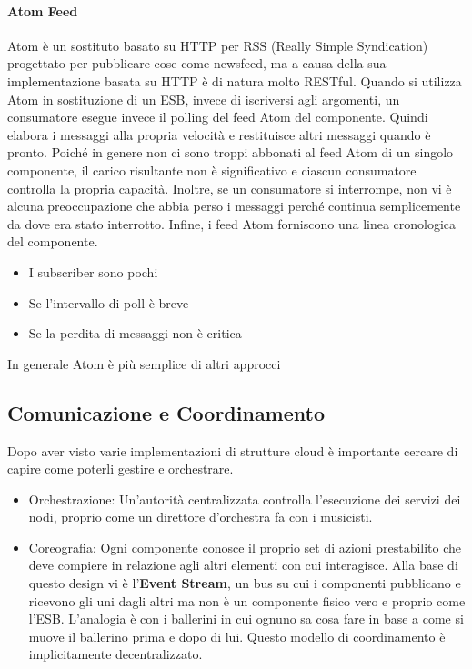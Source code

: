 \documentclass{article}
\begin{document}
		\paragraph{Atom Feed}
		Atom è un sostituto basato su HTTP per RSS (Really Simple Syndication) progettato per pubblicare cose come newsfeed, ma a causa della sua implementazione basata su HTTP è di natura molto RESTful.
		Quando si utilizza Atom in sostituzione di un ESB, invece di iscriversi agli argomenti, un consumatore esegue invece il polling del feed Atom del componente. Quindi elabora i messaggi alla propria velocità e restituisce altri messaggi quando è pronto.
		Poiché in genere non ci sono troppi abbonati al feed Atom di un singolo componente, il carico risultante non è significativo e ciascun consumatore controlla la propria capacità. Inoltre, se un consumatore si interrompe, non vi è alcuna preoccupazione che abbia perso i messaggi perché continua semplicemente da dove era stato interrotto.
		Infine, i feed Atom forniscono una linea cronologica del componente.
		\begin{itemize}
		    \item I subscriber sono pochi
		    \item Se l'intervallo di poll è breve
		    \item Se la perdita di messaggi non è critica
		\end{itemize}
		In generale Atom è più semplice di altri approcci
		
		\subsection{Comunicazione e Coordinamento}
		Dopo aver visto varie implementazioni di strutture cloud è importante cercare di capire come poterli gestire e orchestrare.
		\begin{itemize}
		    \item Orchestrazione: Un'autorità centralizzata controlla l'esecuzione dei servizi dei nodi, proprio come un direttore d'orchestra fa con i musicisti.
		    \item Coreografia: Ogni componente conosce il proprio set di azioni prestabilito che deve compiere in relazione agli altri elementi con cui interagisce. Alla base di questo design vi è l'\textbf{Event Stream}, un bus su cui i componenti pubblicano e ricevono gli uni dagli altri ma non è un componente fisico vero e proprio come l'ESB. L'analogia è con i ballerini in cui ognuno sa cosa fare in base a come si muove il ballerino prima e dopo di lui. Questo modello di coordinamento è implicitamente decentralizzato.
		\end{itemize}
		
\end{document}
